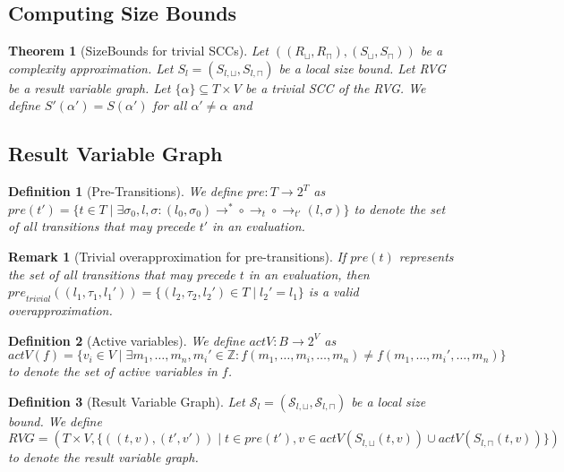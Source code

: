 \documentclass{scrartcl}
\newtheorem{theorem}{Theorem}
\newtheorem{definition}{Definition}
\newtheorem{remark}{Remark}
\begin{document}
\subsection{Computing Size Bounds}

\begin{theorem}[SizeBounds for trivial SCCs]
	Let $((R_\sqcup, R_\sqcap), (S_\sqcup, S_\sqcap))$ be a complexity approximation.
	Let $S_{l} = (S_{l, \sqcup}, S_{l, \sqcap})$ be a local size bound.
	Let RVG be a result variable graph.
	Let $\lbrace \alpha \rbrace \subseteq T \times V$ be a trivial SCC of the RVG.
	We define $S'(\alpha') = S(\alpha')$ for all $\alpha' \neq \alpha$ and
	\[ \]
\end{theorem}

\subsection{Result Variable Graph}

\begin{definition}[Pre-Transitions] 
	We define $\mathit{pre}: T \rightarrow 2^T$ as $\mathit{pre}(t') = \lbrace t \in T \mid \exists \sigma_0, l, \sigma: (l_0, \sigma_0) \rightarrow^* \circ \rightarrow_t \circ \rightarrow_{t'} (l, \sigma) \rbrace$ to denote the set of all transitions that may precede $t'$ in an evaluation.	
\end{definition}

\begin{remark}[Trivial overapproximation for pre-transitions] 
	If $\mathit{pre}(t)$ represents the set of all transitions that may precede $t$ in an evaluation, then $\mathit{pre}_{\mathit{trivial}}((l_1, \tau_1, l_1')) = \lbrace (l_2, \tau_2, l_2') \in T \mid l_2' = l_1  \rbrace$ is a valid overapproximation.
\end{remark}

\begin{definition}[Active variables] 
	We define $\mathit{actV}: B \rightarrow 2^V$ as 
	\[ \mathit{actV}(f) = \lbrace v_i \in V \mid \exists m_1, \dots, m_n, m_i' \in \mathbb{Z}: f(m_1, \dots, m_i, \dots, m_n) \neq f(m_1, \dots, m_i', \dots, m_n) \rbrace \]
	to denote the set of active variables in $f$.
\end{definition}

\begin{definition}[Result Variable Graph]
	Let $\mathcal{S}_{l} = (\mathcal{S}_{l,\sqcup}, \mathcal{S}_{l,\sqcap})$ be a local size bound.
	We define 
	\[ RVG = (T \times V, \lbrace ((t, v), (t', v')) \mid t \in \mathit{pre}(t'), v \in \mathit{actV}(S_{l,\sqcup}(t,v)) \cup \mathit{actV}(S_{l,\sqcap}(t,v)) \rbrace) \]
	to denote the result variable graph.
\end{definition}
\end{document}
